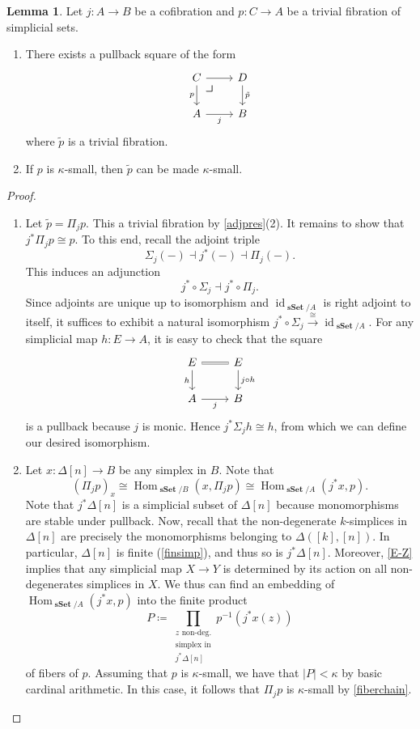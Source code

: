 \documentclass[10pt,letterpaper,cm]{nupset}
\theoremstyle{definition}
\theoremstyle{theorem}
\newtheorem{lemma}[definition]{Lemma}
\theoremstyle{remark}
\newcommand{\0}{\mathbf{0}}
\newcommand{\1}{\mathbf{1}}
\newcommand{\2}{\mathbf{2}}
\DeclareMathOperator{\sset}{\mathbf{sSet}}
\DeclareMathOperator{\Hom}{Hom}
\DeclareMathOperator{\idd}{id}
\newcommand{\be}{\begin{enumerate}}
\newcommand{\ee}{\end{enumerate}}
\begin{document}
\begin{lemma}\label{Quillem2}
Let $j : A \to B$ be a cofibration and $p: C \to A$ be a trivial fibration of simplicial sets. 
\be[label=(\alph*)]
\item There exists a pullback square of the form 
\[
\begin{tikzcd}
C \arrow[d, "p"'] \arrow[r] 
\arrow[dr, phantom, "\scalebox{1.5}{\color{black}$\lrcorner$}" , very near start, color=black]
& D \arrow[d, "\tilde{p}"] \\
A \arrow[r, "j"']           & B                       
\end{tikzcd}
\] where $\tilde{p}$ is a trivial fibration.
\item If $p$ is $\kappa$-small, then  $\tilde{p}$ can be made $\kappa$-small.
\ee
\end{lemma}
\begin{proof}  $ $
\be[label=(\alph*)]
\item Let $\tilde{p} = \Pi_j{p}$. This a trivial fibration by \cref{adjpres}(2). It remains to show that $j^{\ast}{\Pi_j{p}}\cong p$. To this end, recall  the adjoint triple
\[
\Sigma_j({-}) \dashv j^{\ast}({-}) \dashv \Pi_j({-}).
 \]This induces an adjunction
 \[
 j^{\ast} \circ \Sigma_j \dashv  j^{\ast} \circ \Pi_j .
 \] Since adjoints are unique up to isomorphism and $\idd_{\sset/A}$ is right adjoint to itself, it suffices to exhibit a natural isomorphism $ j^{\ast} \circ \Sigma_j \overset{\cong}{\longrightarrow} \idd_{\sset/A}$. For any simplicial map $h : E\to A$, it is easy to check that the  square
 \[
 \begin{tikzcd}
E \arrow[d, "h"'] \arrow[r, equal] & E \arrow[d, "j\circ h"] \\
A \arrow[r, "j"']           & B                      
\end{tikzcd}
\] is a pullback because $j$ is monic. Hence $j^{\ast}{\Sigma_j{h}} \cong h$, from which we can define our desired isomorphism.
 
\item Let $x : \Delta[n] \to B$ be any simplex in $B$. Note that 
\[ \label{fiberchain}
\left(\Pi_j{p}\right)_x \cong \Hom_{\sset/B}(x, \Pi_j{p}) \cong \Hom_{\sset/A}(j^{\ast}{x}, p). \tag{$\ast$}
\] Note that $j^{\ast}{\Delta[n]}$ is a simplicial subset of $\Delta[n]$ because monomorphisms are stable under pullback. Now, recall that the non-degenerate $k$-simplices in $\Delta[n]$ are precisely the monomorphisms belonging to $\varDelta\left(\left[k\right], \left[n\right]\right)$. In particular, $\Delta[n]$ is finite (\cref{finsimp}), and thus so is $j^{\ast}{\Delta[n]}$. Moreover, \cref{E-Z} implies that any simplicial map $X\to Y$ is determined by its action on all non-degenerates simplices in $X$. We thus can find an embedding of $\Hom_{\sset/A}(j^{\ast}{x}, p)$ into the finite product $$P\coloneqq \prod_{\substack{z \text{ non-deg.}\\ \text{simplex in} \\ \text{$j^{\ast}{\Delta[n]}$}}}p^{-1}\left(j^{\ast}{x}(z)\right)$$ of fibers of $p$. Assuming that $p$ is $\kappa$-small, we have that $\left\lvert{P}\right\rvert <\kappa$ by basic cardinal arithmetic. In this case, it follows that $\Pi_j{p}$ is $\kappa$-small by \eqref{fiberchain}.
\ee
\end{proof} 
\end{document}
